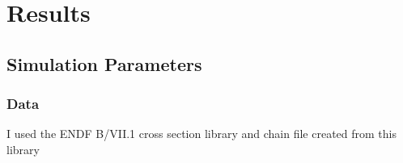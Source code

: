 \chapter{Results}
\label{ch:chapter5}

\section{Simulation Parameters}
\label{sec:simulation-params}

\subsection{Data}
\label{sub:data}

I used the ENDF B/VII.1 cross section library and chain file created from this library
